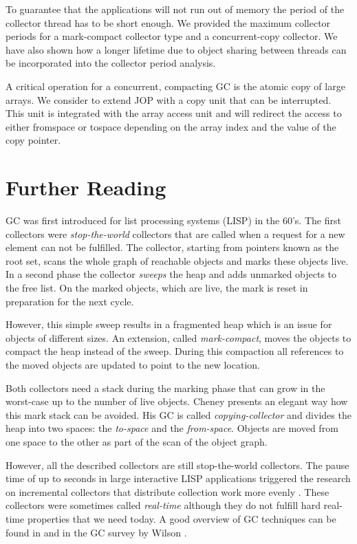 To guarantee that the applications will not run out of memory the
period of the collector thread has to be short enough. We provided
the maximum collector periods for a mark-compact collector type and
a concurrent-copy collector. We have also shown how a longer
lifetime due to object sharing between threads can be incorporated
into the collector period analysis.

A critical operation for a concurrent, compacting GC is the atomic
copy of large arrays. We consider to extend JOP with a copy unit
that can be interrupted. This unit is integrated with the array
access unit and will redirect the access to either fromspace or
tospace depending on the array index and the value of the copy
pointer.

\section{Further Reading}

GC was first introduced for list processing systems (LISP) in the
60's. The first collectors were \emph{stop-the-world} collectors
that are called when a request for a new element can not be
fulfilled. The collector, starting from pointers known as the root
set, scans the whole graph of reachable objects and marks these
objects live. In a second phase the collector \emph{sweeps} the heap
and adds unmarked objects to the free list. On the marked objects,
which are live, the mark is reset in preparation for the next cycle.

However, this simple sweep results in a fragmented heap which is an
issue for objects of different sizes. An extension, called
\emph{mark-compact}, moves the objects to compact the heap instead
of the sweep. During this compaction all references to the moved
objects are updated to point to the new location.


Both collectors need a stack during the marking phase that can grow
in the worst-case up to the number of live objects. Cheney
\cite{gc:cheney70} presents an elegant way how this mark stack can
be avoided. His GC is called \emph{copying-collector} and divides
the heap into two spaces: the \emph{to-space} and the
\emph{from-space}. Objects are moved from one space to the other as
part of the scan of the object graph.

However, all the described collectors are still stop-the-world
collectors. The pause time of up to seconds in large interactive
LISP applications triggered the research on incremental collectors
that distribute collection work more evenly \cite{gc:steele75,
gc:dijkstra78, gc:baker78}. These collectors were sometimes called
\emph{real-time} although they do not fulfill hard real-time
properties that we need today. A good overview of GC techniques can
be found in \cite{gc:jone96} and in the GC survey by Wilson
\cite{gc:wils94}.

